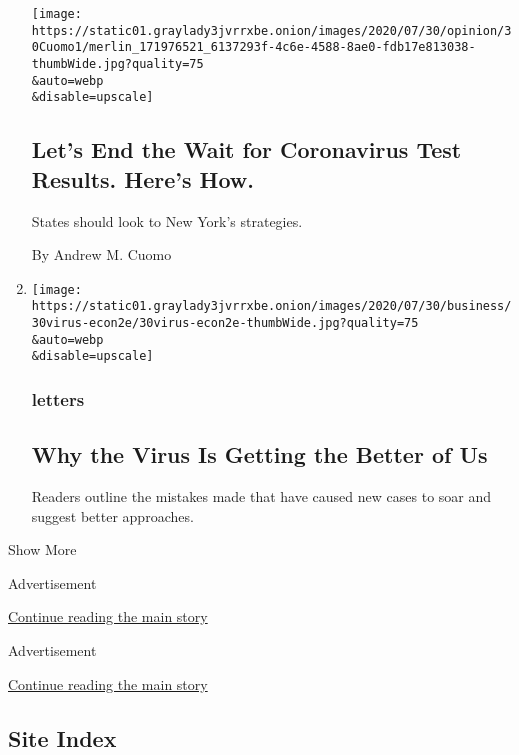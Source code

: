 \begin{enumerate}
  \texttt{[image: https://static01.graylady3jvrrxbe.onion/images/2020/07/30/opinion/30Cuomo1/merlin\_171976521\_6137293f-4c6e-4588-8ae0-fdb17e813038-thumbWide.jpg?quality=75\\\&auto=webp\\\&disable=upscale]}

  \hypertarget{lets-end-the-wait-for-coronavirus-test-results-heres-how}{%
  \subsection{Let's End the Wait for Coronavirus Test Results. Here's
  How.}\label{lets-end-the-wait-for-coronavirus-test-results-heres-how}}

  States should look to New York's strategies.

  By Andrew M. Cuomo
\item
  \href{/2020/07/31/opinion/letters/coronavirus-economy.html}{}

  \texttt{[image: https://static01.graylady3jvrrxbe.onion/images/2020/07/30/business/30virus-econ2e/30virus-econ2e-thumbWide.jpg?quality=75\\\&auto=webp\\\&disable=upscale]}

  \hypertarget{letters-3}{%
  \subsubsection{letters}\label{letters-3}}

  \hypertarget{why-the-virus-is-getting-the-better-of-us}{%
  \subsection{Why the Virus Is Getting the Better of
  Us}\label{why-the-virus-is-getting-the-better-of-us}}

  Readers outline the mistakes made that have caused new cases to soar
  and suggest better approaches.
\end{enumerate}

Show More

Advertisement

\protect\hyperlink{after-mid2}{Continue reading the main story}

Advertisement

\protect\hyperlink{after-mktg}{Continue reading the main story}

\hypertarget{site-index}{%
\subsection{Site Index}\label{site-index}}

